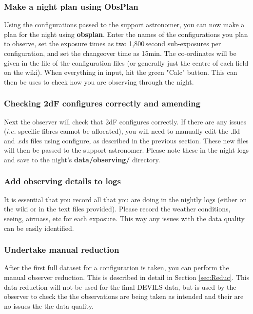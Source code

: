 \documentclass[12pt]{article}
\begin{document}
\subsubsection{Make a night plan using ObsPlan}

Using the configurations passed to the support astronomer, you can now make a plan for the night using \textbf{obsplan}. Enter the names of the configurations you plan to observe, set the exposure times as two 1,800\,second sub-exposures per configuration, and set the changeover time as 15min. The co-ordinates will be given in the file of the configuration files (or generally just the centre of each field on the wiki). When everything in input, hit the green "Calc" button. This can then be uses to check how you are observing through the night.      

\subsubsection{Checking 2dF configures correctly and amending}

Next the observer will check that 2dF configures correctly. If there are any issues ($i.e.$ specific fibres cannot be allocated), you will need to manually edit the .fld and .sds files using configure, as described in the previous section. These new files will then be passed to the support astronomer. Please note these in the night logs and save to the night's \textbf{data/observing/} directory.

\subsubsection{Add observing details to logs}

It is essential that you record all that you are doing in the nightly logs (either on the wiki or in the text files provided). Please record the weather conditions, seeing, airmass, etc for each exposure. This way any issues with the data quality can be easily identified. 


\subsubsection{Undertake manual reduction}

After the first full dataset for a configuration is taken, you can perform the manual observer reduction. This is described in detail in Section \ref{sec:Reduc}. This data reduction will not be used for the final DEVILS data, but is used by the observer to check the the observations are being taken as intended and their are no issues the the data quality.  
\end{document}
